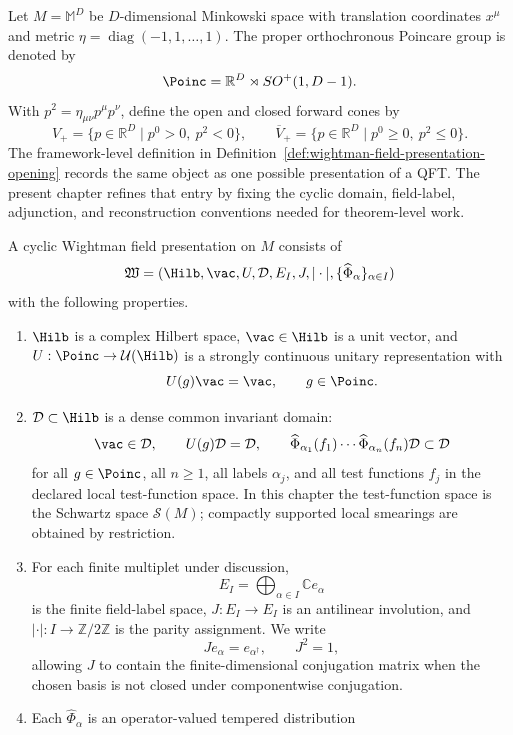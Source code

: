 Let \(M=\mathbb M^D\) be \(D\)-dimensional Minkowski space with
translation coordinates \(x^\mu\) and metric
\(\eta=\operatorname{diag}(-1,1,\ldots,1)\).  The proper orthochronous
Poincare group is denoted by
\[
  \Poinc=\mathbb R^D\rtimes SO^+(1,D-1).
\]
With \(p^2=\eta_{\mu\nu}p^\mu p^\nu\), define the open and closed forward
cones by
\[
  V_+
  =
  \{p\in\mathbb R^D\mid p^0>0,\ p^2<0\},
  \qquad
  \overline V_+
  =
  \{p\in\mathbb R^D\mid p^0\ge0,\ p^2\le0\}.
\]
The framework-level definition in
Definition~\ref{def:wightman-field-presentation-opening} records the same
object as one possible presentation of a QFT.  The present chapter refines
that entry by fixing the cyclic domain, field-label, adjunction, and
reconstruction conventions needed for theorem-level work.

\begin{definition}
\label{def:cyclic-wightman-field-presentation}
A cyclic Wightman field presentation on \(M\) consists of
\[
  \mathfrak W
  =
  (\Hilb,\vac,U,\mathcal D,E_I,J,|\cdot|,
  \{\widehat\Phi_\alpha\}_{\alpha\in I})
\]
with the following properties.
\begin{enumerate}[label=\textup{(\roman*)}]
\item \(\Hilb\) is a complex Hilbert space, \(\vac\in\Hilb\) is a unit vector,
and \(U:\Poinc\to\mathcal U(\Hilb)\) is a strongly continuous unitary
representation with
\[
  U(g)\vac=\vac,\qquad g\in\Poinc .
\]
\item \(\mathcal D\subset\Hilb\) is a dense common invariant domain:
\[
  \vac\in\mathcal D,\qquad
  U(g)\mathcal D=\mathcal D,\qquad
  \widehat\Phi_{\alpha_1}(f_1)\cdots
  \widehat\Phi_{\alpha_n}(f_n)\mathcal D\subset\mathcal D
\]
for all \(g\in\Poinc\), all \(n\ge1\), all labels \(\alpha_j\), and all
test functions \(f_j\) in the declared local test-function space.  In this
chapter the test-function space is the Schwartz space \(\mathcal S(M)\);
compactly supported local smearings are obtained by restriction.
\item For each finite multiplet under discussion,
\[
  E_I=\bigoplus_{\alpha\in I}\mathbb C e_\alpha
\]
is the finite field-label space, \(J:E_I\to E_I\) is an antilinear involution,
and \(|\cdot|:I\to\mathbb Z/2\mathbb Z\) is the parity assignment.  We write
\[
  J e_\alpha=e_{\alpha^\dagger},\qquad J^2=1,
\]
allowing \(J\) to contain the finite-dimensional conjugation matrix when the
chosen basis is not closed under componentwise conjugation.
\item Each \(\widehat\Phi_\alpha\) is an operator-valued tempered distribution

\end{enumerate}
\end{definition}
